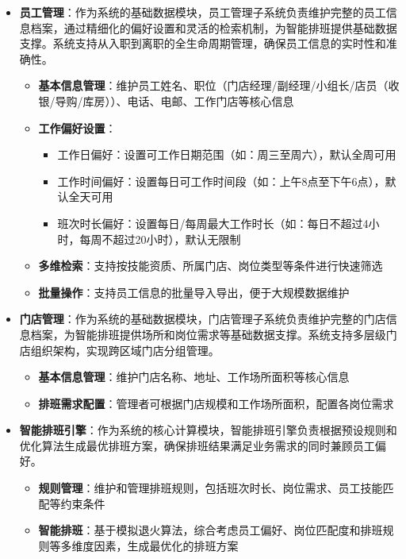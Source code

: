 \documentclass{ctexart}
\begin{document}
\begin{itemize}
    \item \textbf{员工管理}：作为系统的基础数据模块，员工管理子系统负责维护完整的员工信息档案，通过精细化的偏好设置和灵活的检索机制，为智能排班提供基础数据支撑。系统支持从入职到离职的全生命周期管理，确保员工信息的实时性和准确性。
        \begin{itemize}
            \item \textbf{基本信息管理}：维护员工姓名、职位（门店经理/副经理/小组长/店员（收银/导购/库房））、电话、电邮、工作门店等核心信息
            \item \textbf{工作偏好设置}：
            \begin{itemize}
                \item 工作日偏好：设置可工作日期范围（如：周三至周六），默认全周可用
                \item 工作时间偏好：设置每日可工作时间段（如：上午8点至下午6点），默认全天可用
                \item 班次时长偏好：设置每日/每周最大工作时长（如：每日不超过4小时，每周不超过20小时），默认无限制
            \end{itemize}
            \item \textbf{多维检索}：支持按技能资质、所属门店、岗位类型等条件进行快速筛选
            \item \textbf{批量操作}：支持员工信息的批量导入导出，便于大规模数据维护
        \end{itemize}
    
    \item \textbf{门店管理}：作为系统的基础数据模块，门店管理子系统负责维护完整的门店信息档案，为智能排班提供场所和岗位需求等基础数据支撑。系统支持多层级门店组织架构，实现跨区域门店分组管理。
        \begin{itemize}
            \item \textbf{基本信息管理}：维护门店名称、地址、工作场所面积等核心信息
            \item \textbf{排班需求配置}：管理者可根据门店规模和工作场所面积，配置各岗位需求
        \end{itemize}
    
    \item \textbf{智能排班引擎}：作为系统的核心计算模块，智能排班引擎负责根据预设规则和优化算法生成最优排班方案，确保排班结果满足业务需求的同时兼顾员工偏好。
        \begin{itemize}
            \item \textbf{规则管理}：维护和管理排班规则，包括班次时长、岗位需求、员工技能匹配等约束条件
            \item \textbf{智能排班}：基于模拟退火算法，综合考虑员工偏好、岗位匹配度和排班规则等多维度因素，生成最优化的排班方案
        \end{itemize}
    

\end{itemize}
\end{document}
